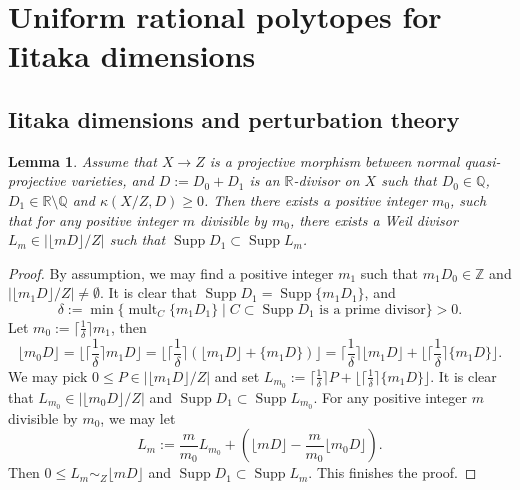 \documentclass[11pt]{amsart}
\numberwithin{equation}{section}
\newcommand{\Qq}{\mathbb{Q}}
\newcommand{\Rr}{\mathbb{R}}
\newcommand{\Zz}{\mathbb{Z}}
\newcommand{\Supp}{\operatorname{Supp}}
\newcommand{\mult}{\operatorname{mult}}
\newcommand{\lf}{\lfloor}
\newcommand{\rf}{\rfloor}
\newtheorem{lem}[thm]{Lemma}
\theoremstyle{definition}
\theoremstyle{definition}
\begin{document}
\section{Uniform rational polytopes for Iitaka dimensions}\label{sec4}
\subsection{Iitaka dimensions and perturbation theory}

\begin{lem}\label{lem: real kodaira dimension positive has support irrational}
Assume that $X\rightarrow Z$ is a projective morphism between normal quasi-projective varieties, and $D:=D_0+D_1$ is an $\Rr$-divisor on $X$ such that $D_0\in\Qq$, $D_1\in\Rr\setminus\Qq$ and $\kappa(X/Z,D)\geq 0$. Then there exists a positive integer $m_0$, such that for any positive integer $m$ divisible by $m_0$, there exists a Weil divisor $L_m\in |\lfloor mD\rfloor/Z|$ such that $\Supp D_1\subset\Supp L_m$.
\end{lem}
\begin{proof}
By assumption, we may find a positive integer $m_1$ such that $m_1D_0\in\Zz$ and $|\lfloor m_1D\rfloor/Z|\not=\emptyset$. It is clear that $\Supp D_1=\Supp \{m_1D_1\}$, and
$$\delta:=\min\{\mult_C\{m_1D_1\}\mid C\subset\Supp D_1\text{ is a prime divisor}\}>0.$$
Let $m_0:=\lceil\frac{1}{\delta}\rceil m_1$, then
$$\lfloor m_0D\rfloor=\lfloor\lceil\frac{1}{\delta}\rceil m_1D\rfloor=\lfloor\lceil\frac{1}{\delta}\rceil(\lfloor m_1D\rfloor +\{m_1D\})\rfloor=\lceil\frac{1}{\delta}\rceil\lfloor m_1D\rfloor+\lfloor\lceil\frac{1}{\delta}\rceil\{m_1D\}\rfloor.$$
We may pick $0\leq P\in |\lfloor m_1D\rfloor/Z|$ and set $L_{m_0}:=\lceil\frac{1}{\delta}\rceil P+\lfloor\lceil\frac{1}{\delta}\rceil\{m_1D\}\rfloor.$ It is clear that $L_{m_0}\in|\lf m_0D\rf/Z|$ and $\Supp D_1\subset\Supp L_{m_0}.$ For any positive integer $m$ divisible by $m_0$, we may let
$$L_m:=\frac{m}{m_0}L_{m_0}+(\lfloor mD\rfloor-\frac{m}{m_0}\lfloor m_0D\rfloor).$$
Then $0\le L_m\sim_Z\lfloor mD\rfloor$ and $\Supp D_1\subset\Supp L_m$. This finishes the proof.
\end{proof}
\end{document}
